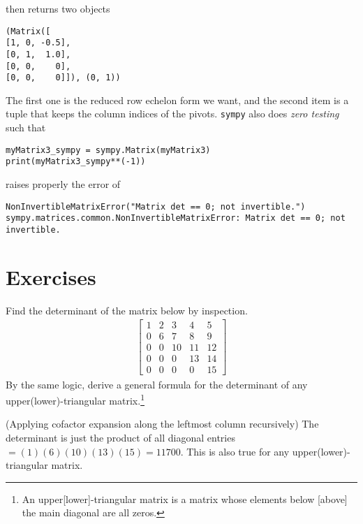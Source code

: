 then returns two objects
\begin{lstlisting}
(Matrix([
[1, 0, -0.5],
[0, 1,  1.0],
[0, 0,    0],
[0, 0,    0]]), (0, 1))    
\end{lstlisting}
The first one is the reduced row echelon form we want, and the second item is a tuple that keeps the column indices of the pivots. \verb|sympy| also does \textit{zero testing} such that
\begin{lstlisting}
myMatrix3_sympy = sympy.Matrix(myMatrix3)
print(myMatrix3_sympy**(-1))
\end{lstlisting}
raises properly the error of
\begin{lstlisting}
NonInvertibleMatrixError("Matrix det == 0; not invertible.") sympy.matrices.common.NonInvertibleMatrixError: Matrix det == 0; not invertible. 
\end{lstlisting}

\section{Exercises}

\begin{Exercise}
Find the determinant of the matrix below by inspection.
\begin{align*}
\begin{bmatrix}
1 & 2 & 3 & 4 & 5 \\
0 & 6 & 7 & 8 & 9 \\
0 & 0 & 10 & 11 & 12 \\
0 & 0 & 0 & 13 & 14 \\
0 & 0 & 0 & 0 & 15
\end{bmatrix}    
\end{align*}
By the same logic, derive a general formula for the determinant of any upper(lower)-triangular matrix.\footnote{An upper[lower]-triangular matrix is a matrix whose elements below [above] the main diagonal are all zeros.}
\end{Exercise}
\begin{Answer}
(Applying cofactor expansion along the leftmost column recursively) The determinant is just the product of all diagonal entries $= (1)(6)(10)(13)(15) = 11700$. This is also true for any upper(lower)-triangular matrix.
\end{Answer}

